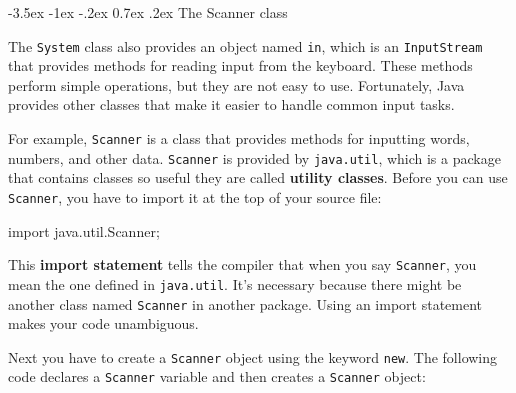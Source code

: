 \documentclass[12pt]{book}
\makeatletter
\renewcommand{\section}{\@startsection {section}{1}{\z@}%
    {-3.5ex \@plus -1ex \@minus -.2ex}%
    {0.7ex \@plus.2ex}%
    {\normalfont\Large\bfseries}}
\theoremstyle{exercise}
\newcommand{\java}[1]{\lstinline{#1}} %
\makeatother
\begin{document}
\section{The Scanner class}


%

The \java{System} class also provides an object named \java{in}, which is an \java{InputStream} that provides methods for reading input from the keyboard.
These methods perform simple operations, but they are not easy to use.
Fortunately, Java provides other classes that make it easier to handle common input tasks.


For example, \java{Scanner} is a class that provides methods for inputting words, numbers, and other data.
\java{Scanner} is provided by \java{java.util}, which is a package that contains classes so useful they are called {\bf utility classes}.
Before you can use \java{Scanner}, you have to import it at the top of your source file:

\begin{code}
import java.util.Scanner;
\end{code}


This {\bf import statement} tells the compiler that when you say \java{Scanner}, you mean the one defined in \java{java.util}.
It's necessary because there might be another class named \java{Scanner} in another package.
Using an import statement makes your code unambiguous.

Next you have to create a \java{Scanner} object using the keyword \java{new}.
The following code declares a \java{Scanner} variable and then creates a \java{Scanner} object:
\end{document}
